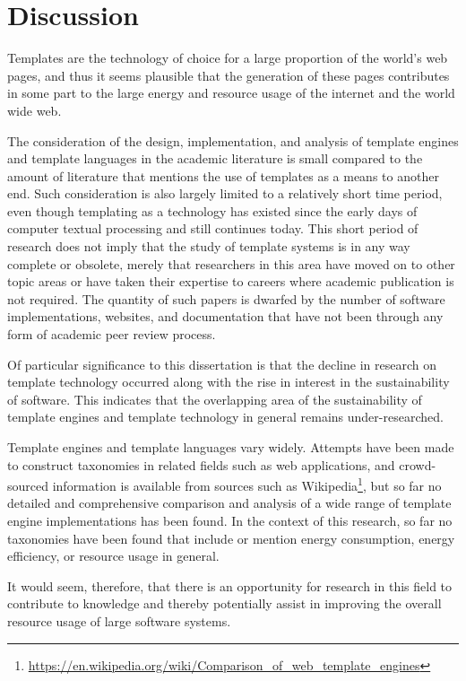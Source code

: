 \section{Discussion}

Templates are the technology of choice for a large proportion of the world's web pages, and thus it seems plausible that the generation of these pages contributes in some part to the large energy and resource usage of the internet and the world wide web.

The consideration of the design, implementation, and analysis of \gls{template engine}s and \gls{template language}s in the academic literature is small compared to the amount of literature that mentions the use of templates as a means to another end. Such consideration is also largely limited to a relatively short time period, even though templating as a technology has existed since the early days of computer textual processing and still continues today. This short period of research does not imply that the study of template systems is in any way complete or obsolete, merely that researchers in this area have moved on to other topic areas or have taken their expertise to careers where academic publication is not required. The quantity of such papers is dwarfed by the number of software implementations, websites, and documentation that have not been through any form of academic peer review process.

Of particular significance to this dissertation is that the decline in research on template technology occurred along with the rise in interest in the sustainability of software. This indicates that the overlapping area of the sustainability of \gls{template engine}s and template technology in general remains under-researched.

Template engines and \gls{template language}s vary widely. Attempts have been made to construct taxonomies in related fields such as web applications, and crowd-sourced information is available from sources such as Wikipedia\footnote{\url{https://en.wikipedia.org/wiki/Comparison_of_web_template_engines}}, but so far no detailed and comprehensive comparison and analysis of a wide range of \gls{template engine} implementations has been found. In the context of this research, so far no taxonomies have been found that include or mention energy consumption, energy efficiency, or resource usage in general.

It would seem, therefore, that there is an opportunity for research in this field to contribute to knowledge and thereby potentially assist in improving the overall resource usage of large software systems.


